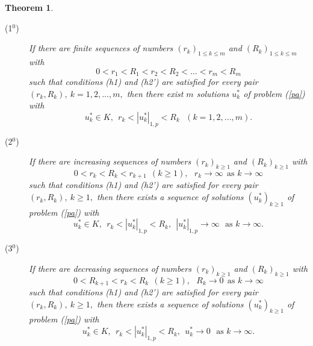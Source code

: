 \documentclass{birkjour}
\newtheorem{theorem}{Theorem}[section]
\theoremstyle{definition}
\theoremstyle{remark}
\numberwithin{equation}{section}
\begin{document}
\begin{theorem}

\begin{description}
\item[(1$^{0}$)] If there are finite sequences of numbers $\left(
r_{k}\right) _{1\leq k\leq m}$ and $\left( R_{k}\right) _{1\leq k\leq m}$
with
\begin{equation*}
0<r_{1}<R_{1}<r_{2}<R_{2}<\dots <r_{m}<R_{m}
\end{equation*}%
such that conditions (h1) and (h2') are satisfied for every pair $\left(
r_{k},R_{k}\right) ,\ k=1,2,...,m,$ then there exist $m$ solutions $%
u_{k}^{\ast }$ of problem (\ref{pa}) with%
\begin{equation*}
u_{k}^{\ast }\in K,\ \ r_{k}<\left\vert u_{k}^{\ast }\right\vert
_{1,p}<R_{k}\ \ \ \left( k=1,2,...,m\right) .
\end{equation*}

\item[(2$^{0}$)] If there are increasing sequences of numbers $\left(
r_{k}\right) _{k\geq 1}$ and $\left( R_{k}\right) _{k\geq 1}$ with%
\begin{equation*}
0<r_{k}<R_{k}<r_{k+1}\ \ \left( k\geq 1\right) ,\ \ \ r_{k}\rightarrow
\infty \ \ \text{as }k\rightarrow \infty
\end{equation*}%
such that conditions (h1) and (h2') are satisfied for every pair $\left(
r_{k},R_{k}\right) ,\ k\geq 1,$ then there exists a sequence of solutions $%
\left( u_{k}^{\ast }\right) _{k\geq 1}$ of problem (\ref{pa}) with%
\begin{equation*}
u_{k}^{\ast }\in K,\ \ r_{k}<\left\vert u_{k}^{\ast }\right\vert
_{1,p}<R_{k},\ \ \left\vert u_{k}^{\ast }\right\vert _{1,p}\rightarrow
\infty \ \ \ \text{as }k\rightarrow \infty .
\end{equation*}

\item[(3$^{0}$)] If there are decreasing sequences of numbers $\left(
r_{k}\right) _{k\geq 1}$ and $\left( R_{k}\right) _{k\geq 1}$ with%
\begin{equation*}
0<R_{k+1}<r_{k}<R_{k}\ \ \left( k\geq 1\right) ,\ \ \ R_{k}\rightarrow 0\ \
\text{as }k\rightarrow \infty
\end{equation*}%
such that conditions (h1) and (h2') are satisfied for every pair $\left(
r_{k},R_{k}\right) ,\ k\geq 1,$ then there exists a sequence of solutions $%
\left( u_{k}^{\ast }\right) _{k\geq 1}$ of problem (\ref{pa}) with%
\begin{equation*}
u_{k}^{\ast }\in K,\ \ r_{k}<\left\vert u_{k}^{\ast }\right\vert
_{1,p}<R_{k},\ \ u_{k}^{\ast }\rightarrow 0\ \ \ \text{as }k\rightarrow
\infty .
\end{equation*}
\end{description}
\end{theorem}
\end{document}
